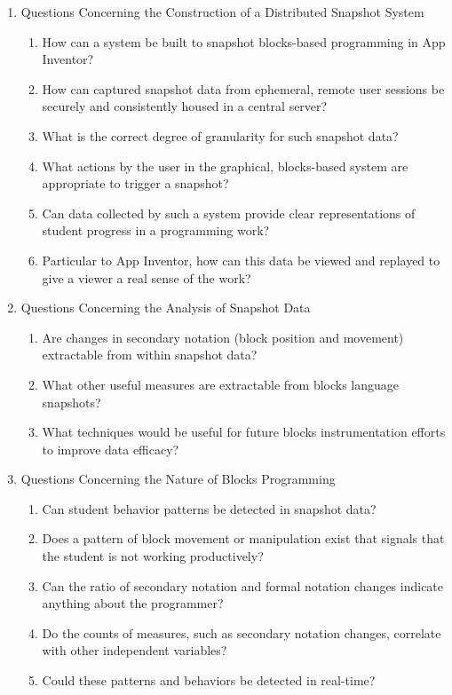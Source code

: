 \begin{enumerate}
\item Questions Concerning the Construction of a Distributed Snapshot System

\begin{enumerate}
\item \label{RQ:1.1} How can a system be built to snapshot blocks-based programming in App Inventor? 
\item \label{RQ:1.2} How can captured snapshot data from ephemeral, remote user sessions be securely and consistently housed in a central server? 
\item \label{RQ:1.3} What is the correct degree of granularity for such snapshot data?
\item \label{RQ:1.4} What actions by the user in the graphical, blocks-based system are appropriate to trigger a snapshot?
\item \label{RQ:1.5} Can data collected by such a system provide clear representations of student progress in a programming work?
\item \label{RQ:1.6} Particular to App Inventor, how can this data be viewed and replayed to give a viewer a real sense of the work?
\end{enumerate}

\item Questions Concerning the Analysis of Snapshot Data
\begin{enumerate}
\item \label{RQ:2.1} Are changes in secondary notation (block position and movement) extractable from within snapshot data?
\item \label{RQ:2.2} What other useful measures are extractable from blocks language snapshots?
\item \label{RQ:2.3} What techniques would be useful for future blocks instrumentation efforts to improve data efficacy?
\end{enumerate}

\item Questions Concerning the Nature of Blocks Programming
\begin{enumerate}
\item \label{RQ:3.1} Can student behavior patterns be detected in snapshot data?
\item \label{RQ:3.2} Does a pattern of block movement or manipulation exist that signals that the student is not working productively?
\item \label{RQ:3.3} Can the ratio of secondary notation and formal notation changes indicate anything about the programmer?
\item \label{RQ:3.4} Do the counts of measures, such as secondary notation changes, correlate with other independent variables?
\item \label{RQ:3.5} Could these patterns and behaviors be detected in real-time?
\end{enumerate}

\end{enumerate}



